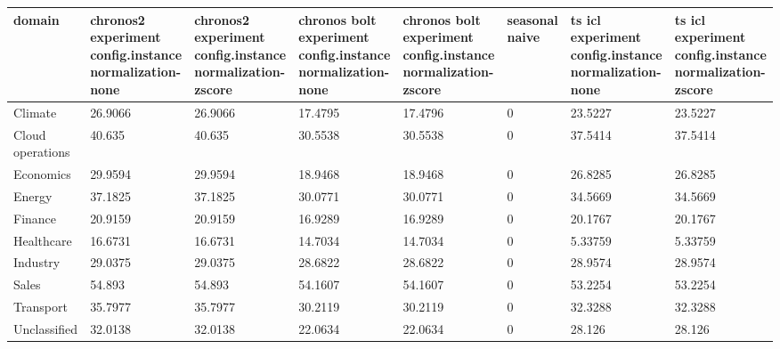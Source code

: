 \begin{tabular}{llllllll}
\toprule
domain & chronos2  experiment config.instance normalization-none & chronos2  experiment config.instance normalization-zscore & chronos bolt  experiment config.instance normalization-none & chronos bolt  experiment config.instance normalization-zscore & seasonal naive & ts icl  experiment config.instance normalization-none & ts icl  experiment config.instance normalization-zscore \\
\midrule
Climate & 26.9066 & 26.9066 & 17.4795 & 17.4796 & 0 & 23.5227 & 23.5227 \\
Cloud operations & 40.635 & 40.635 & 30.5538 & 30.5538 & 0 & 37.5414 & 37.5414 \\
Economics & 29.9594 & 29.9594 & 18.9468 & 18.9468 & 0 & 26.8285 & 26.8285 \\
Energy & 37.1825 & 37.1825 & 30.0771 & 30.0771 & 0 & 34.5669 & 34.5669 \\
Finance & 20.9159 & 20.9159 & 16.9289 & 16.9289 & 0 & 20.1767 & 20.1767 \\
Healthcare & 16.6731 & 16.6731 & 14.7034 & 14.7034 & 0 & 5.33759 & 5.33759 \\
Industry & 29.0375 & 29.0375 & 28.6822 & 28.6822 & 0 & 28.9574 & 28.9574 \\
Sales & 54.893 & 54.893 & 54.1607 & 54.1607 & 0 & 53.2254 & 53.2254 \\
Transport & 35.7977 & 35.7977 & 30.2119 & 30.2119 & 0 & 32.3288 & 32.3288 \\
Unclassified & 32.0138 & 32.0138 & 22.0634 & 22.0634 & 0 & 28.126 & 28.126 \\
\bottomrule
\end{tabular}
